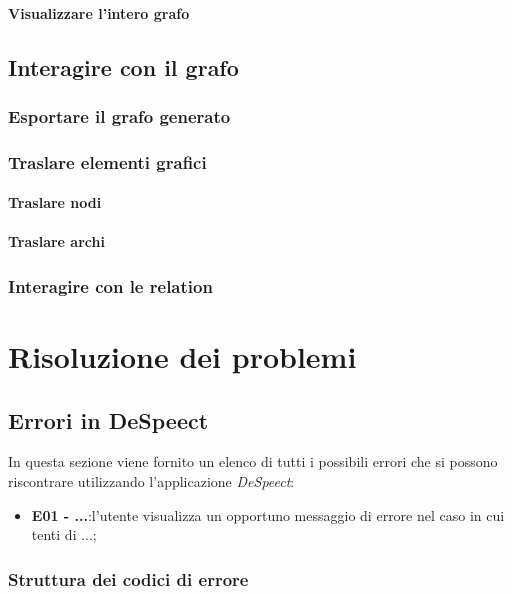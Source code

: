 \documentclass[openany,12pt,a4paper]{report}
\begin{document}
	\subsubsection{Visualizzare l'intero grafo}
	
	\section{Interagire con il grafo}
	
	\subsection{Esportare il grafo generato}
	
	\subsection{Traslare elementi grafici}
	
	\subsubsection{Traslare nodi}
	
	\subsubsection{Traslare archi}
	
	\subsection{Interagire con le relation}
	
	\chapter{Risoluzione dei problemi}
	
	\section{Errori in DeSpeect}
	
	In questa sezione viene fornito un elenco di tutti i possibili errori che si possono riscontrare utilizzando l’applicazione \textit{DeSpeect}:
	\begin{itemize}
		\item \textbf{E01 - ...}:l'utente visualizza un opportuno messaggio di errore nel caso in cui tenti di ...;
	\end{itemize}
	
	\subsection{Struttura dei codici di errore} 
	
\end{document}
